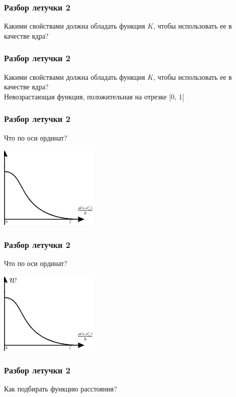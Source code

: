 \documentclass[12pt]{beamer}
\begin{document}
\begin{frame}\frametitle{Разбор летучки 2}
Какими свойствами должна обладать функция $K$, чтобы использовать ее в качестве ядра?
\end{frame}

\begin{frame}\frametitle{Разбор летучки 2}
Какими свойствами должна обладать функция $K$, чтобы использовать ее в качестве ядра?\\
\vspace{5mm}
Невозрастающая функция, положительная на отрезке [0, 1]
\end{frame}

\begin{frame}\frametitle{Разбор летучки 2}
      Что по оси ординат? \\
   \begin{minipage}[t]{0.35\linewidth}

	\includegraphics[height=150px]{images/parzen}
   \end{minipage}
\end{frame}

\begin{frame}\frametitle{Разбор летучки 2}
      Что по оси ординат? \\
   \begin{minipage}[t]{0.35\linewidth}

	\includegraphics[height=150px]{images/parzen1}
   \end{minipage}
\end{frame}

\begin{frame}\frametitle{Разбор летучки 2}
Как подбирать функцию расстояния?
\end{frame}
 
\end{document}
